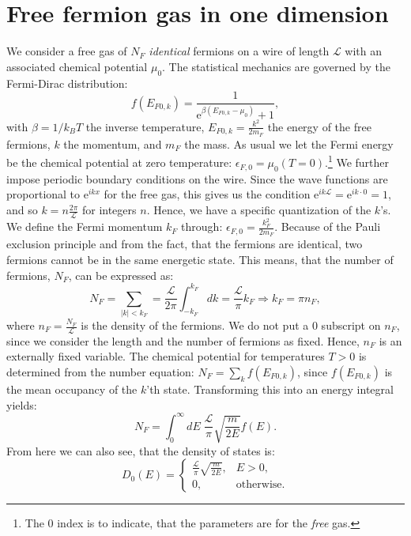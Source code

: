 \section{Free fermion gas in one dimension} \label{sec.chemicalpotential.freegas}
We consider a free gas of $N_F$ \textit{identical} fermions on a wire of length $\mathcal{L}$ with an associated chemical potential $\mu_0$. The statistical mechanics are governed by the Fermi-Dirac distribution:
\begin{equation}
f(E_{F0,k}) = \frac{1}{\text{e}^{\beta(E_{F0,k}-\mu_0)} + 1},
\end{equation}
with $\beta = 1/k_BT$ the inverse temperature, $E_{F0,k} = \frac{k^2}{2m_F}$ the energy of the free fermions, $k$ the momentum, and $m_F$ the mass. As usual we let the Fermi energy be the chemical potential at zero temperature: $\epsilon_{F,0} = \mu_0(T=0)$.\footnote{The 0 index is to indicate, that the parameters are for the \textit{free} gas.} We further impose periodic boundary conditions on the wire. Since the wave functions are proportional to $\text{e}^{ikx}$ for the free gas, this gives us the condition $\text{e}^{ik\mathcal{L}} = \text{e}^{ik\cdot 0} = 1$, and so $k = n\frac{2\pi}{\mathcal{L}}$ for integers $n$. Hence, we have a specific quantization of the $k$'s. We define the Fermi momentum $k_F$ through: $\epsilon_{F,0} = \frac{k_F^2}{2m_F}$. Because of the Pauli exclusion principle and from the fact, that the fermions are identical, two fermions cannot be in the same energetic state. This means, that the number of fermions, $N_F$, can be expressed as:
\begin{equation}
N_F = \sum_{|k|< k_F} = \frac{\mathcal{L}}{2\pi} \int_{-k_F}^{k_F} dk = \frac{\mathcal{L}}{\pi} k_F \Rightarrow k_F = \pi n_F, 
\label{eq.relationkfnf}
\end{equation}
where $n_F = \frac{N_F}{\mathcal{L}}$ is the density of the fermions. We do not put a 0 subscript on $n_F$, since we consider the length and the number of fermions as fixed. Hence, $n_F$ is an externally fixed variable. The chemical potential for temperatures $T>0$ is determined from the number equation: $N_F = \sum_k f(E_{F0,k})$, since $f(E_{F0,k})$ is the mean occupancy of the $k$'th state. Transforming this into an energy integral yields:
\begin{equation}
N_F = \int_0^\infty dE \; \frac{\mathcal{L}}{\pi}\sqrt{\frac{m}{2E}} f(E). 
\label{eq.numberequationfreegas}
\end{equation}
From here we can also see, that the density of states is:
\begin{equation}
D_0(E) = \left\{\begin{matrix}
 \frac{\mathcal{L}}{\pi}\sqrt{\frac{m}{2E}}, & E > 0,  \\ 
 0, & \text{otherwise}. 
\end{matrix}\right. 
\label{eq.densityofstatesfreegas}
\end{equation}
